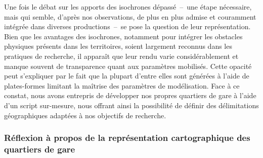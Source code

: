 \begin{refsegment}
Une fois le débat sur les apports des isochrones dépassé~–~une étape nécessaire, mais qui semble, d’après nos observations, de plus en plus admise et couramment intégrée dans diverses productions~–~se pose la question de leur représentation. Bien que les avantages des isochrones, notamment pour intégrer les obstacles physiques présents dans les territoires, soient largement reconnus dans les pratiques de recherche, il apparaît que leur rendu varie considérablement et manque souvent de transparence quant aux paramètres mobilisés. Cette opacité peut s'expliquer par le fait que la plupart d'entre elles sont générées à l’aide de plates-formes limitant la maîtrise des paramètres de modélisation. Face à ce constat, nous avons entrepris de développer nos propres quartiers de gare à l’aide d’un script sur-mesure, nous offrant ainsi la possibilité de définir des délimitations géographiques adaptées à nos objectifs de recherche.%

\subsubsection*{Réflexion à propos de la représentation cartographique des quartiers de gare
    \label{chap3:quartiers-gare-python}
    }


\end{refsegment}
